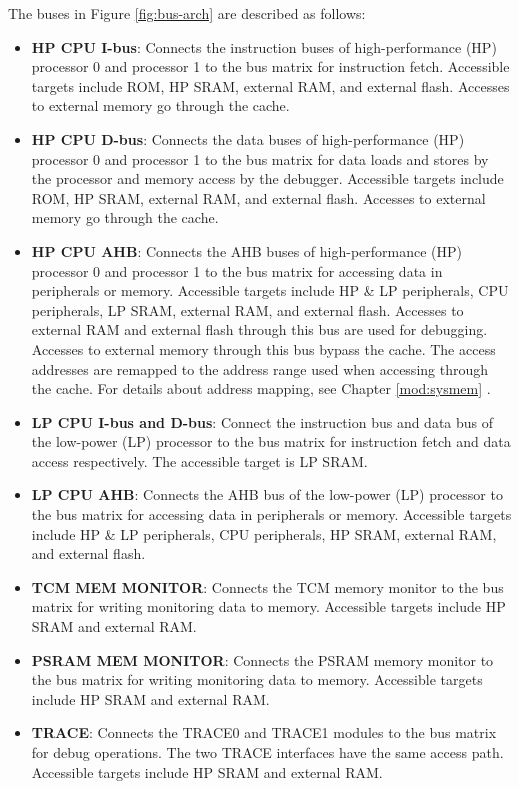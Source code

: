 \documentclass[main\_\_EN.tex]{subfiles}
\begin{document}
The buses in Figure \ref{fig:bus-arch} \textit{} are described as follows:

\begin{itemize}
    \item \textbf{HP CPU I-bus}: Connects the instruction buses of high-performance (HP) processor 0 and processor 1 to the bus matrix for instruction fetch. Accessible targets include ROM, HP SRAM, external RAM, and external flash. Accesses to external memory go through the cache.
    \item \textbf{HP CPU D-bus}: Connects the data buses of high-performance (HP) processor 0 and processor 1 to the bus matrix for data loads and stores by the processor and memory access by the debugger. Accessible targets include ROM, HP SRAM, external RAM, and external flash. Accesses to external memory go through the cache.
    \item \textbf{HP CPU AHB}: Connects the AHB buses of high-performance (HP) processor 0 and processor 1 to the bus matrix for accessing data in peripherals or memory. Accessible targets include HP \& LP peripherals, CPU peripherals, LP SRAM, external RAM, and external flash. Accesses to external RAM and external flash through this bus are used for debugging. Accesses to external memory through this bus bypass the cache. The access addresses are remapped to the address range used when accessing through the cache. For details about address mapping, see Chapter \ref{mod:sysmem} \textit{}.
    \item \textbf{LP CPU I-bus and D-bus}: Connect the instruction bus and data bus of the low-power (LP) processor to the bus matrix for instruction fetch and data access respectively. The accessible target is LP SRAM.
    \item \textbf{LP CPU AHB}: Connects the AHB bus of the low-power (LP) processor to the bus matrix for accessing data in peripherals or memory. Accessible targets include HP \& LP peripherals, CPU peripherals, HP SRAM, external RAM, and external flash.
    \item \textbf{TCM MEM MONITOR}: Connects the TCM memory monitor to the bus matrix for writing monitoring data to memory. Accessible targets include HP SRAM and external RAM.
    \item \textbf{PSRAM MEM MONITOR}: Connects the PSRAM memory monitor to the bus matrix for writing monitoring data to memory. Accessible targets include HP SRAM and external RAM.
    \item \textbf{TRACE}: Connects the TRACE0 and TRACE1 modules to the bus matrix for debug operations. The two TRACE interfaces have the same access path. Accessible targets include HP SRAM and external RAM.

\end{itemize}
\end{document}
